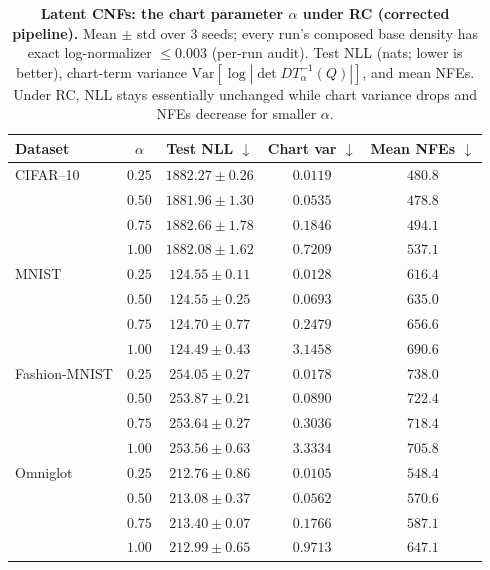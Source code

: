 \documentclass{article}
\theoremstyle{definition}
\theoremstyle{remark}
\begin{document}
\begin{table}[t]
  \centering
  \caption{\textbf{Latent CNFs: the chart parameter $\alpha$ under RC (corrected pipeline).} Mean $\pm$ std over 3 seeds; every run's composed base density has exact log-normalizer $\le 0.003$ (per-run audit).
  Test NLL (nats; lower is better), chart-term variance
  $\mathrm{Var}[\log|\det DT_\alpha^{-1}(Q)|]$, and mean NFEs.
  Under RC, NLL stays essentially unchanged while chart variance drops and NFEs decrease for smaller $\alpha$.}
  \label{tab:cnf_alpha_sweep}
  \small
  \begin{tabular}{lcccc}
    \toprule
    Dataset & $\alpha$ & Test NLL $\downarrow$ & Chart var $\downarrow$ & Mean NFEs $\downarrow$ \\
    \midrule
    CIFAR--10
      & $0.25$ & $1882.27 \pm 0.26$ & $0.0119$ & $480.8$ \\
      & $0.50$ & $1881.96 \pm 1.30$ & $0.0535$ & $478.8$ \\
      & $0.75$ & $1882.66 \pm 1.78$ & $0.1846$ & $494.1$ \\
      & $1.00$ & $1882.08 \pm 1.62$ & $0.7209$ & $537.1$ \\
    \midrule
    MNIST
      & $0.25$ & $124.55 \pm 0.11$ & $0.0128$ & $616.4$ \\
      & $0.50$ & $124.55 \pm 0.25$ & $0.0693$ & $635.0$ \\
      & $0.75$ & $124.70 \pm 0.77$ & $0.2479$ & $656.6$ \\
      & $1.00$ & $124.49 \pm 0.43$ & $3.1458$ & $690.6$ \\
    \midrule
    Fashion-MNIST
      & $0.25$ & $254.05 \pm 0.27$ & $0.0178$ & $738.0$ \\
      & $0.50$ & $253.87 \pm 0.21$ & $0.0890$ & $722.4$ \\
      & $0.75$ & $253.64 \pm 0.27$ & $0.3036$ & $718.4$ \\
      & $1.00$ & $253.56 \pm 0.63$ & $3.3334$ & $705.8$ \\
    \midrule
    Omniglot
      & $0.25$ & $212.76 \pm 0.86$ & $0.0105$ & $548.4$ \\
      & $0.50$ & $213.08 \pm 0.37$ & $0.0562$ & $570.6$ \\
      & $0.75$ & $213.40 \pm 0.07$ & $0.1766$ & $587.1$ \\
      & $1.00$ & $212.99 \pm 0.65$ & $0.9713$ & $647.1$ \\
    \bottomrule
  \end{tabular}
\end{table}
\end{document}
